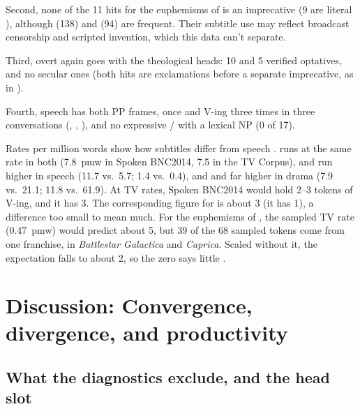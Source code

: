\documentclass[12pt]{article}
\begin{document}
Second, none of the 11 hits for the euphemisms of  is an imprecative (9 are literal ), although  (138) and  (94) are frequent. Their subtitle use may reflect broadcast censorship and scripted invention, which this data can't separate.

Third, overt  again goes with the theological heads: 10  and 5 verified  optatives, and no secular ones (both  hits are exclamations before a separate imprecative, as in ).

Fourth, speech has both PP frames,  once and  V-ing three times in three conversations (, , ), and no expressive / with a lexical NP (0 of 17).

Rates per million words show how subtitles differ from speech \citep{kilgarriff2001}.  runs at the same rate in both (7.8~pmw in Spoken BNC2014, 7.5 in the TV Corpus),  and  run higher in speech (11.7 vs.\ 5.7; 1.4 vs.\ 0.4), and  and  far higher in drama (7.9 vs.\ 21.1; 11.8 vs.\ 61.9). At TV rates, Spoken BNC2014 would hold 2--3 tokens of  V-ing, and it has 3. The corresponding figure for  is about 3 (it has 1), a difference too small to mean much. For the euphemisms of , the sampled TV rate (0.47~pmw) would predict about 5, but 39 of the 68 sampled tokens come from one franchise,  in \emph{Battlestar Galactica} and \emph{Caprica}. Scaled without it, the expectation falls to about 2, so the zero says little \citep{kilgarriff2005}.

\section{Discussion: Convergence, divergence, and productivity}
\label{sec:discussion}

\subsection{What the diagnostics exclude, and the head slot}
\label{sec:ruled-out}
\end{document}
